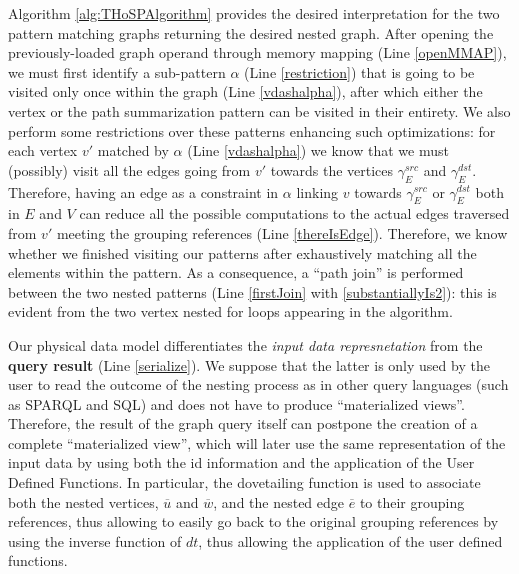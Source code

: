 Algorithm \ref{alg:THoSPAlgorithm} provides the desired interpretation for the two pattern matching graphs returning the desired nested graph. 
 After opening the previously-loaded graph operand through memory mapping (Line \ref{openMMAP}), we must first identify a sub-pattern $\alpha$ (Line \ref{restriction}) that is going to be visited only once within the graph (Line \ref{vdashalpha}), after which either the vertex or the path summarization pattern can be visited in their entirety. We also perform some restrictions over these patterns enhancing such optimizations: for each vertex $v'$ matched by $\alpha$ (Line \ref{vdashalpha}) we know that we must (possibly) visit all the edges going from $v'$ towards the vertices $\gamma_E^{src}$ and $\gamma_E^{dst}$.  Therefore, having an edge as a constraint in $\alpha$ linking $v$ towards $\gamma_E^{src}$ or $\gamma_E^{dst}$ both in $E$ and $V$ can reduce all the possible computations to the actual edges traversed from $v'$ meeting the grouping references (Line \ref{thereIsEdge}). Therefore, we know whether we finished visiting our patterns after exhaustively matching all the elements within the pattern.
As a consequence, a ``path join'' is performed between the two nested patterns (Line \ref{firstJoin} with \ref{substantiallyIs2}): this is evident from the two vertex nested for loops appearing in the algorithm.  %



Our physical data model differentiates the \textit{input data  represnetation} from the \textbf{query result} (Line \ref{serialize}). 
We suppose that the latter is only used by the user to read the outcome of the nesting process as in other  query languages (such as SPARQL and SQL) and does not have to
produce ``materialized views''. Therefore, the result of the graph query itself can postpone the creation of a complete ``materialized view'', which will later use the same representation of the input data by using both the id information and the application of the User Defined Functions. In particular, the dovetailing function is used to associate both the nested vertices, $\overline{u}$ and $\overline{w}$, and the nested edge $\overline{e}$ to their grouping references, thus allowing to easily go back to the original grouping references by using the inverse function of $dt$, thus allowing the application of the user defined functions.


